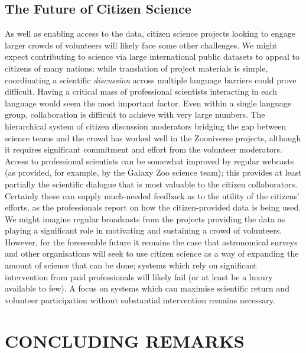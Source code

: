 \documentclass{ar2e}
\begin{document}
 


\subsection{The Future of Citizen Science}

As well as enabling access to the data, citizen science projects looking to
engage larger crowds of volunteers will likely face some other  challenges. We
might expect contributing to science via large international public datasets to
appeal to citizens of many nations: while translation of project materials is simple, 
coordinating a scientific \textit{discussion} across multiple language barriers could prove difficult. Having a critical mass of
professional scientists interacting in each language would seem the most
important factor. Even within a single language group, collaboration is
difficult to achieve with  very large numbers. The hierarchical system of
citizen discussion  moderators bridging the gap between science teams and the
crowd has worked well in the Zooniverse projects, although it requires
significant commitment and effort from the volunteer moderators. Access to
professional scientists can be somewhat improved by regular webcasts (as
provided, for example, by the Galaxy Zoo science team); this provides at least
partially the scientific dialogue that is most valuable to the citizen
collaborators. Certainly these can supply much-needed feedback as to the utility
of the citizens' efforts, as the professionals report on how the
citizen-provided data is being used. We might imagine regular broadcasts from
the projects providing the data as playing a significant role in motivating and
sustaining a crowd of volunteers. However, for the foreseeable future it remains the case
that astronomical surveys and other organisations will seek to use citizen science as a 
way of expanding the amount of science that can be done; systems which rely on significant
intervention from paid professionals will likely fail (or at least be a luxury available to few). A
focus on systems which can maximise scientific return and volunteer participation without
substantial intervention remains necessary. 


\section{CONCLUDING REMARKS}
\label{sec:conclusions}
\end{document}
